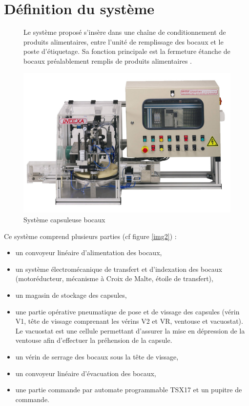 

\section{Définition du système}

\begin{figure}
 \begin{minipage}{0.55\linewidth}
Le système proposé s'insère dans une chaîne de conditionnement de produits alimentaires, entre l'unité de remplissage des bocaux et le poste d'étiquetage. Sa fonction principale est la \og fermeture étanche de bocaux préalablement remplis de produits alimentaires \fg.
 \end{minipage}
 \hfill
  \begin{minipage}{0.43\linewidth}
   \centering\includegraphics[width=0.9\linewidth]{img/Indexa.jpg}
   \caption{Système capsuleuse bocaux}
   \label{img1}
  \end{minipage}
\end{figure}

Ce système comprend plusieurs parties (cf figure \ref{img2}) : 
\begin{itemize}
 \item un convoyeur linéaire d'alimentation des bocaux, 
 \item un système électromécanique de transfert et d'indexation des bocaux (motoréducteur, mécanisme à Croix de Malte, étoile de transfert), 
 \item un magasin de stockage des capsules, 
 \item une partie opérative pneumatique de pose et de vissage des capsules (vérin V1, tête de vissage comprenant les vérins V2 et VR, ventouse et vacuostat). Le vacuostat est une cellule permettant d'assurer la mise en dépression de la ventouse afin d'effectuer la préhension de la capsule. 
 \item un vérin de serrage des bocaux sous la tête de vissage, 
 \item un convoyeur linéaire d'évacuation des bocaux, 
 \item une partie commande par automate programmable TSX17 et un pupitre de commande. 
\end{itemize}

